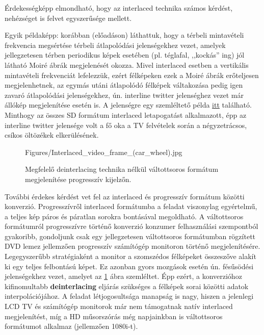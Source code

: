 \vspace{3mm}
Érdekességképp elmondható, hogy az interlaced technika számos kérdést, nehézséget is felvet egyszerűsége mellett.

Egyik példaképp: korábban (előadáson) láthattuk, hogy a térbeli mintavételi frekvencia megsértése térbeli átlapolódási jelenségekhez vezet, amelyek jellegzetesen térben periodikus képek esetében (pl. téglafal, ,,kockás'' ing) jól látható Moiré ábrák megjelenését okozza.
Mivel interlaced esetben a vertikális mintavételi frekvenciát lefelezzük, ezért félképeken ezek a Moiré ábrák erőteljesen megjelenhetnek, az egymás utáni átlapolódó félképek váltakozása pedig igen zavaró átlapolódási jelenségekhez, ún. interline twitter jelenséghez vezet már állókép megjelenítése esetén is.
A jelenségre egy szemléltető példa \href{https://en.wikipedia.org/wiki/File:Indian_Head_interlace.gif}{itt} található.
Minthogy az összes SD formátum interlaced letapogatást alkalmazott, épp az interline twitter jelensége volt a fő oka a TV felvételek során a négyzetrácsos, csíkos öltözékek elkerülésének.

\begin{figure}  
\small
  \begin{minipage}[c]{0.64\textwidth}
	\begin{overpic}[width = 1\columnwidth ]{Figures/Interlaced_video_frame_(car_wheel).jpg}
	\end{overpic}   \end{minipage}\hfill
	\begin{minipage}[c]{0.3\textwidth}
    \caption{Megfelelő deinterlacing technika nélkül váltottsoros formátum megjelenítése progresszív kijelzőn.}
\label{fig:deinterlacing}  \end{minipage}
\end{figure}

További érdekes kérdést vet fel az interlaced és progresszív formátum közötti konverzió.
Progresszívről interlaced formátumba a feladat viszonylag egyértelmű, a teljes kép páros és páratlan sorokra bontásával megoldható.
A váltottsoros formátumról progresszívre történő konverzió konzumer felhasználási szempontból gyakoribb, gondoljunk csak egy jellegzetesen váltottsoros formátumban rögzített DVD lemez jellemzően progresszív számítógép monitoron történő megjelenítésére.
Legegyszerűbb stratégiaként a monitor a szomszédos félképeket összeszőve alakít ki egy teljes felbontású képet.
Ez azonban gyors mozgások esetén ún. fésűsödési jelenségekhez vezet, amelyet az \ref{fig:deinterlacing} ábra szemléltet.
Épp ezért, a konverzióhoz kifinomultabb \textbf{deinterlacing} eljárás szükséges a félképek sorai közötti adatok interpolációjához.
A feladat létjogosultsága manapság is nagy, hiszen a jelenlegi LCD TV és számítógép monitorok már nem támogatnak natív interlaced megjelenítést, míg a HD műsorszórás még napjainkban is váltottsoros formátumot alkalmaz (jellemzően 1080i-t).

